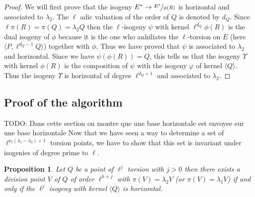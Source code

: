 \documentclass{article}
\newcommand{\todo}[1]{{\color{red}TODO: #1}}
\theoremstyle{plain}
\newtheorem{prop}[thm]{Proposition}
\theoremstyle{definition}
\theoremstyle{remark}
\begin{document}
\begin{proof}
We will first prove that the isogeny $E^* \rightarrow \nicefrac{E^*}{\phi(R)}$ is horizontal and associated to $\lambda_2$.
\newline
The $\ell$ adic valuation of the order of $Q$ is denoted by $d_Q$. Since $\ell \pi(R)=\pi(Q)=\lambda_2Q$ then the $\ell$-isogeny $\psi$ with kernel $\ell^{d_Q}\phi(R)$ is the dual isogeny of $\phi$ because it is the one who anhiliates the $\ell$-torsion on $E$ (here $\langle P, \ell^{d_Q-1}Q \rangle$) together with $\phi$. Thus we have proved that $\psi$ is associated to $\lambda_2$ and horizontal. 
\newline
Since we have $\psi(\phi(R))=Q$, this tells us that the isogeny $\Upsilon$ with kernel $\phi(R)$ is the composition of $\psi$ with the isogeny $\varphi$ of kernel $\langle Q \rangle$. Thus the isogeny $\Upsilon$ is horizontal of degree $\ell^{d_Q+1}$ and associated to $\lambda_2$. 
\end{proof}


\subsection{Proof of the algorithm}
\todo{Dans cette section on montre que une base horizontale est envoyee sur une base horizontale}
Now that we have seen a way to determine a set of $\ell^{\nu_{\ell}(\lambda_1-\lambda_2)+1}$ torsion points, we have to show that this set is invariant under isogenies of degree prime to $\ell$.

\begin{prop}
Let $Q$ be a point of $\ell^j$ torsion with $j>0$ then there exists a division point $V$ of $Q$ of order $\ell^{h+j}$ with $\pi(V)=\lambda_2V$ (or $\pi(V)=\lambda_1V$) if and only if the $\ell^j$ isogeny with kernel $\langle Q \rangle $ is horizontal.
\end{prop}
\end{document}
